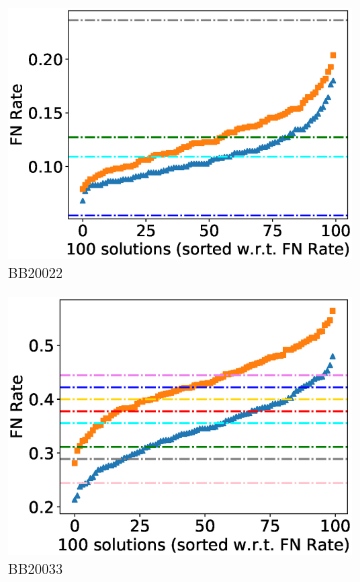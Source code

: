\begin{figure}[!htbp]
\begin{adjustwidth}{-1cm}{-1cm}
		\begin{subfigure}{0.22\textwidth}
			\includegraphics[width=\columnwidth]{Figure/summary/precomputedInit/Balibase/BB20022_fnrate_density_single_run}
			\caption{BB20022}
		\end{subfigure}
		\begin{subfigure}{0.22\textwidth}
			\includegraphics[width=\columnwidth]{Figure/summary/precomputedInit/Balibase/BB20033_fnrate_density_single_run}
			\caption{BB20033}
		\end{subfigure}
		\begin{subfigure}{0.22\textwidth}

\end{subfigure}
\end{adjustwidth}
\end{figure}
